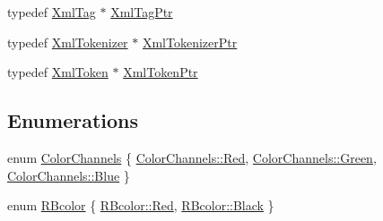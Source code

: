 \begin{DoxyCompactItemize}
\item 
typedef \hyperlink{class_k_k_b_1_1_xml_tag}{Xml\+Tag} $\ast$ \hyperlink{namespace_k_k_b_a9253a3ea8a5da18ca82be4ca2b390ef0}{Xml\+Tag\+Ptr}
\item 
typedef \hyperlink{class_k_k_b_1_1_xml_tokenizer}{Xml\+Tokenizer} $\ast$ \hyperlink{namespace_k_k_b_a0272123692093dc63b5e530719bc874e}{Xml\+Tokenizer\+Ptr}
\item 
typedef \hyperlink{class_k_k_b_1_1_xml_token}{Xml\+Token} $\ast$ \hyperlink{namespace_k_k_b_af349a060847626df6b468fe15d373972}{Xml\+Token\+Ptr}
\end{DoxyCompactItemize}
\subsection*{Enumerations}
\begin{DoxyCompactItemize}
\item 
enum \hyperlink{namespace_k_k_b_a91743d17eafa05c7ff4e08017ac2b718}{Color\+Channels} \{ \hyperlink{namespace_k_k_b_a91743d17eafa05c7ff4e08017ac2b718aee38e4d5dd68c4e440825018d549cb47}{Color\+Channels\+::\+Red}, 
\hyperlink{namespace_k_k_b_a91743d17eafa05c7ff4e08017ac2b718ad382816a3cbeed082c9e216e7392eed1}{Color\+Channels\+::\+Green}, 
\hyperlink{namespace_k_k_b_a91743d17eafa05c7ff4e08017ac2b718a9594eec95be70e7b1710f730fdda33d9}{Color\+Channels\+::\+Blue}
 \}
\item 
enum \hyperlink{namespace_k_k_b_a8efe8f8963250404085241be900c7548}{R\+Bcolor} \{ \hyperlink{namespace_k_k_b_a8efe8f8963250404085241be900c7548aee38e4d5dd68c4e440825018d549cb47}{R\+Bcolor\+::\+Red}, 
\hyperlink{namespace_k_k_b_a8efe8f8963250404085241be900c7548ae90dfb84e30edf611e326eeb04d680de}{R\+Bcolor\+::\+Black}
 \}
\end{DoxyCompactItemize}
